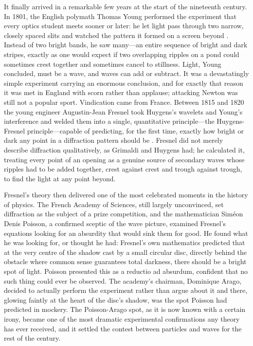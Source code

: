 	It finally arrived in a remarkable few years at the start of the nineteenth century. In 1801, the English polymath Thomas Young performed the experiment that every optics student meets sooner or later: he let light pass through two narrow, closely spaced slits and watched the pattern it formed on a screen beyond \cite{young1804bakerian}. Instead of two bright bands, he saw many---an entire sequence of bright and dark stripes, exactly as one would expect if two overlapping ripples on a pond could sometimes crest together and sometimes cancel to stillness. Light, Young concluded, must be a wave, and waves can add or subtract. It was a devastatingly simple experiment carrying an enormous conclusion, and for exactly that reason it was met in England with scorn rather than applause; attacking Newton was still not a popular sport. Vindication came from France. Between 1815 and 1820 the young engineer Augustin-Jean Fresnel took Huygens's wavelets and Young's interference and welded them into a single, quantitative principle---the Huygens-Fresnel principle---capable of predicting, for the first time, exactly how bright or dark any point in a diffraction pattern should be \cite{fresnel1819memoire}. Fresnel did not merely describe diffraction qualitatively, as Grimaldi and Huygens had; he calculated it, treating every point of an opening as a genuine source of secondary waves whose ripples had to be added together, crest against crest and trough against trough, to find the light at any point beyond.

	Fresnel's theory then delivered one of the most celebrated moments in the history of physics. The French Academy of Sciences, still largely unconvinced, set diffraction as the subject of a prize competition, and the mathematician Siméon Denis Poisson, a confirmed sceptic of the wave picture, examined Fresnel's equations looking for an absurdity that would sink them for good. He found what he was looking for, or thought he had: Fresnel's own mathematics predicted that at the very centre of the shadow cast by a small circular disc, directly behind the obstacle where common sense guarantees total darkness, there should be a bright spot of light. Poisson presented this as a reductio ad absurdum, confident that no such thing could ever be observed. The academy's chairman, Dominique Arago, decided to actually perform the experiment rather than argue about it and there, glowing faintly at the heart of the disc's shadow, was the spot Poisson had predicted in mockery. The Poisson-Arago spot, as it is now known with a certain irony, became one of the most dramatic experimental confirmations any theory has ever received, and it settled the contest between particles and waves for the rest of the century.

